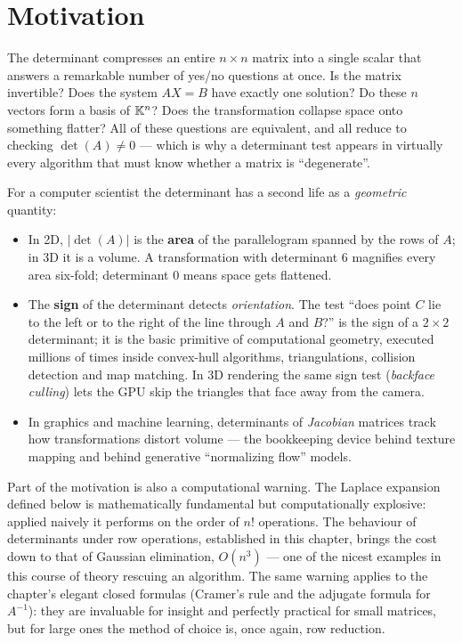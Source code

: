 \section{Motivation}

The determinant compresses an entire $n\times n$ matrix into a single scalar that answers a remarkable
number of yes/no questions at once. Is the matrix invertible? Does the system $AX=B$ have exactly one
solution? Do these $n$ vectors form a basis of $\mathbb{K}^n$? Does the transformation collapse space onto
something flatter? All of these questions are equivalent, and all reduce to checking $\det(A)\neq 0$ —
which is why a determinant test appears in virtually every algorithm that must know whether a matrix is
``degenerate''.

For a computer scientist the determinant has a second life as a \emph{geometric} quantity:

\begin{itemize}
\item In 2D, $|\det(A)|$ is the \textbf{area} of the parallelogram spanned by the rows of $A$; in 3D it is
a volume. A transformation with determinant $6$ magnifies every area six-fold; determinant $0$ means space
gets flattened.
\item The \textbf{sign} of the determinant detects \emph{orientation}. The test ``does point $C$ lie to
the left or to the right of the line through $A$ and $B$?'' is the sign of a $2\times 2$ determinant; it
is the basic primitive of computational geometry, executed millions of times inside convex-hull
algorithms, triangulations, collision detection and map matching. In 3D rendering the same sign test
(\emph{backface culling}) lets the GPU skip the triangles that face away from the camera.
\item In graphics and machine learning, determinants of \emph{Jacobian} matrices track how transformations
distort volume — the bookkeeping device behind texture mapping and behind generative ``normalizing flow''
models.
\end{itemize}

Part of the motivation is also a computational warning. The Laplace expansion defined below is
mathematically fundamental but computationally explosive: applied naively it performs on the order of $n!$
operations. The behaviour of determinants under row operations, established in this chapter, brings the
cost down to that of Gaussian elimination, $O(n^3)$ — one of the nicest examples in this course of theory
rescuing an algorithm. The same warning applies to the chapter's elegant closed formulas (Cramer's rule
and the adjugate formula for $A^{-1}$): they are invaluable for insight and perfectly practical for small
matrices, but for large ones the method of choice is, once again, row reduction.

